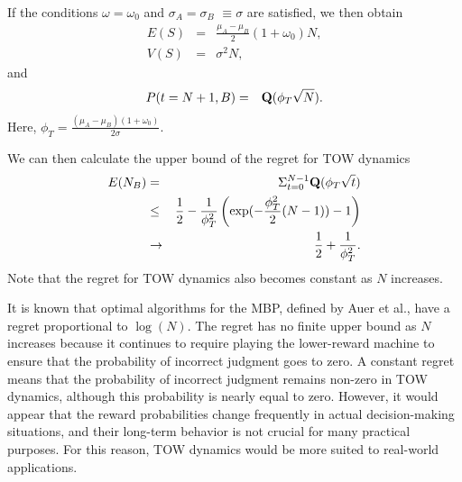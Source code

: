 \documentclass[twocolumn,showpacs,preprintnumbers,amsmath,amssymb]{revtex4}
\begin{document}
If the conditions $\omega  = \omega_0$ and $\sigma_A = \sigma_B$ $\equiv \sigma$ are satisfied, 
we then obtain 
\begin{eqnarray}
E (S)  & = & \frac{\mu_A - \mu_B}{2} (1 + \omega_0) N ,\\
V (S)  & = & {\sigma^2} N ,
\end{eqnarray} 
and 
\begin{eqnarray}
P(t=N+1,B) & = & {\bf Q}(\phi_{T} \sqrt{N}) .   
\end{eqnarray}
Here, $\phi_{T} = \frac{(\mu_A - \mu_B) (1 + \omega_0)}{2 \sigma}$.

We can then calculate the upper bound of the regret for TOW dynamics
\begin{eqnarray}
E(N_B) & = & \Sigma_{t=0}^{N-1} {\bf Q}(\phi_{T} \sqrt{t}) \nonumber \\
       & \leq & \frac{1}{2} - \frac{1}{\phi_{T}^2} \left( \exp(-\frac{\phi_{T}^2}{2}(N-1))  - 1  \right) \\
       & \rightarrow & \frac{1}{2} + \frac{1}{\phi_{T}^2} .
\end{eqnarray} 
Note that the regret for TOW dynamics also becomes constant as $N$ increases.

It is known that optimal algorithms for the MBP, defined by Auer et al., have a regret proportional to $\log(N)$. 
The regret has no finite upper bound as $N$ increases because it continues to require playing the lower-reward machine to ensure that the probability of incorrect judgment goes to zero.  
A constant regret means that the probability of incorrect judgment remains non-zero in TOW dynamics, although this probability is nearly equal to zero.
However, it would appear that the reward probabilities change frequently in actual decision-making situations, and their long-term behavior is not crucial for many practical purposes.
For this reason, TOW dynamics would be more suited to real-world applications.
\end{document}
